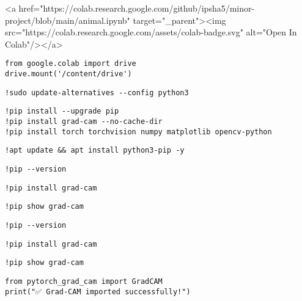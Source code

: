 

<a href="https://colab.research.google.com/github/ipsha5/minor-project/blob/main/animal.ipynb" target="_parent"><img src="https://colab.research.google.com/assets/colab-badge.svg" alt="Open In Colab"/></a>

\begin{verbatim}
from google.colab import drive
drive.mount('/content/drive')
\end{verbatim}

\begin{verbatim}
!sudo update-alternatives --config python3

\end{verbatim}

\begin{verbatim}
!pip install --upgrade pip
!pip install grad-cam --no-cache-dir
!pip install torch torchvision numpy matplotlib opencv-python
\end{verbatim}

\begin{verbatim}
!apt update && apt install python3-pip -y
\end{verbatim}

\begin{verbatim}
!pip --version
\end{verbatim}

\begin{verbatim}
!pip install grad-cam

\end{verbatim}

\begin{verbatim}
!pip show grad-cam

\end{verbatim}

\begin{verbatim}
!pip --version

\end{verbatim}

\begin{verbatim}
!pip install grad-cam

\end{verbatim}

\begin{verbatim}
!pip show grad-cam

\end{verbatim}

\begin{verbatim}
from pytorch_grad_cam import GradCAM
print("✅ Grad-CAM imported successfully!")

\end{verbatim}

